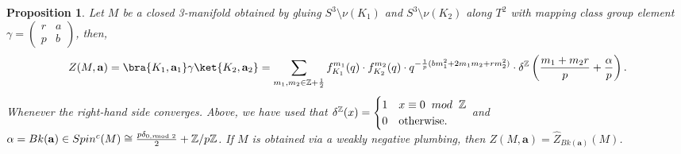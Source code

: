 \documentclass{article}
\newcommand{\Z}{{\mathbb Z}}
\newtheorem{proposition}{Proposition}[section]
\numberwithin{corollary}{theorem}
\numberwithin{corollary}{proposition}
\begin{document}
\begin{proposition} \label{splicing_theorem}
Let $M$ be a closed 3-manifold obtained by gluing $S^3 \setminus \nu(K_1)$ and $S^3 \setminus \nu(K_2)$ along $T^2$ with mapping class group element $\gamma = \begin{pmatrix}
    r&a\\
    p&b
\end{pmatrix}$, then, 
    $$Z(M,\mathbf{a}) =\bra{K_1,\mathbf{a}_1}\gamma \ket{K_2,\mathbf{a}_2} = \sum_{m_1,m_2 \in \mathbb{Z}+\frac{1}{2}} f^{m_1}_{K_1}(q)\cdot f^{m_2}_{K_2}(q) \cdot q^{-\frac{1}{p}(b m_{1}^{2}+2 m_{1} m_{2}+ r m_{2}^{2})} \cdot \delta^\Z\left(\frac{m_{1}+m_{2} r}{p}+ \frac{\alpha}{p}  \right).$$
    Whenever the right-hand side converges. Above, we have used that $\delta^\mathbb{Z} (x) = \begin{cases} 
       1 & x\equiv0\hspace{2mm}mod\hspace{2mm}\mathbb{Z}\\
      0 & \text{otherwise.}
   \end{cases}$ and $\alpha = Bk(\mathbf{a})\in Spin^c(M) \cong \frac{p \delta_{0, r \hspace{-0.2cm} \mod 2}}{2}+ \Z/p \Z $. If $M$ is obtained via a weakly negative plumbing, then $Z(M,\mathbf{a}) = \hat{Z}_{Bk(\mathbf{a})}(M)$. 
\end{proposition}
\end{document}
